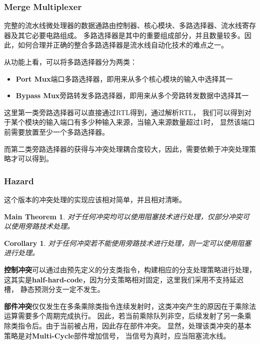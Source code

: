 \documentclass[hyperref,UTF8]{ctexart}
\newtheorem{cor}[thm]{Corollary}
\newtheorem{mthm}[thm]{Main Theorem}
\theoremstyle{definition}
\theoremstyle{remark}
\numberwithin{equation}{subsection}
\newcommand{\Emph}{\textbf}
\begin{document}
\subsubsection{Merge Multiplexer}

	完整的流水线微处理器的数据通路由控制器、核心模块、多路选择器、流水线寄存器及其它必要电路组成。
	多路选择器是其中的重要组成部分，并且数量较多。因此，如何合理并正确的整合多路选择器是流水线自动化技术的难点之一。
	
	从功能上看，可以将多路选择器分为两类：
	\begin{itemize}
	
		\item \Emph{Port Mux}端口多路选择器，即用来从多个核心模块的输入中选择其一
		
		\item \Emph{Bypass Mux}旁路转发多路选择器，即用来从多个旁路转发数据中选择其一
		
	\end{itemize}
	
	这里第一类旁路选择器可以直接通过RTL得到，通过解析RTL，
	我们可以得到对于某个模块的输入端口有多少种输入来源，当输入来源数量超过1时，
	显然该端口前需要放置至少一个多路选择器。
	
	而第二类旁路选择器的获得与冲突处理耦合度较大，因此，需要依赖于冲突处理策略才可以得到。
	
\subsubsection{Hazard}	
	
	这个版本的冲突处理的实现应该相对简单，并且相对清晰。
	
	\begin{mthm}
		对于任何冲突均可以使用阻塞技术进行处理，仅部分冲突可以使用旁路技术处理。
	\end{mthm}
	
	\begin{cor}
	\label{cor:hazard_handle_principle}
		对于任何冲突若不能使用旁路技术进行处理，则一定可以使用阻塞进行处理。
	\end{cor}
	
	\Emph{控制冲突}可以通过由预先定义的分支类指令，构建相应的分支处理策略进行处理，
	这其实是\Emph{half-hard-code}，因为分支策略相对固定，这里我们采用不支持延迟槽，
	静态预测分支一定不发生。
	
	\Emph{部件冲突}仅仅发生在多条乘除类指令连续发射时，这类冲突产生的原因在于乘除法运算需要多个周期完成执行。
	因此，若当前乘除队列非空，后续发射了另一条乘除类指令后。由于当前被占用，因此存在部件冲突。
	显然，处理该类冲突的基本策略是对\Emph{Multi-Cycle}部件增加信号，
	当信号为真时，应当阻塞流水线。
	
\end{document}
